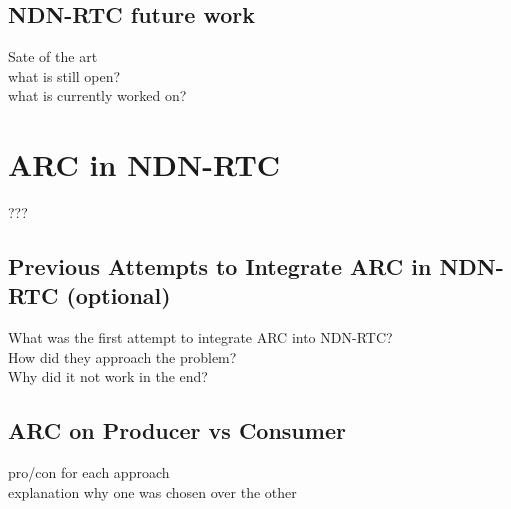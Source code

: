 \subsection{NDN-RTC future work}
Sate of the art \\
what is still open? \\
what is currently worked on?

\section{ARC in NDN-RTC}
???
\subsection{Previous Attempts to Integrate ARC in NDN-RTC (optional)}
What was the first attempt to integrate ARC into NDN-RTC? \\
How did they approach the problem? \\
Why did it not work in the end? \\

\subsection{ARC on Producer vs Consumer}
pro/con for each approach \\
explanation why one was chosen over the other

